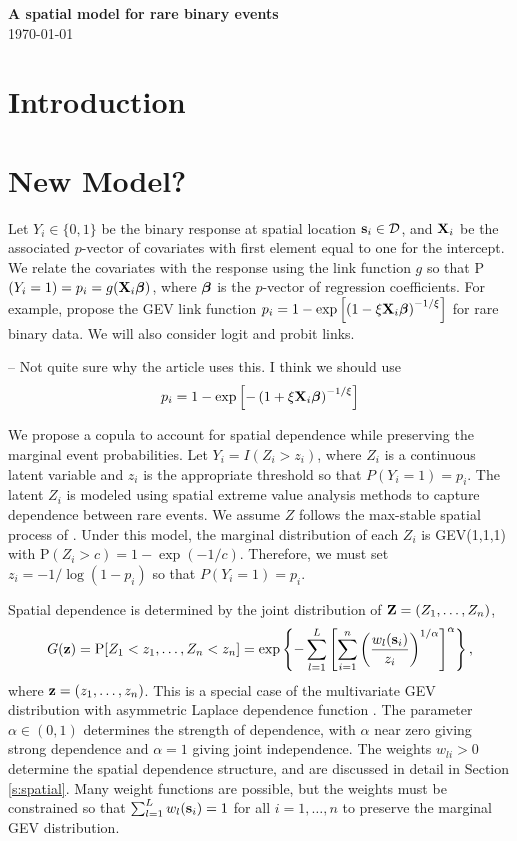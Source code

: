 \documentclass[11pt]{article}
\newcommand{\bbeta}{ \mbox{\boldmath $\beta$}}
\newcommand{\bX}{ \mbox{\bf X}}
\newcommand{\bZ}{ \mbox{\bf Z}}
\newcommand{\bz}{ \mbox{\bf z}}
\newcommand{\bs}{ \mbox{\bf s}}
\newcommand{\calD}{{\cal D}}
\newcommand{\beq}{ \begin{equation}}
\newcommand{\eeq}{ \end{equation}}
\begin{document}
\linenumbers

\begin{center}
{\Large {\bf A spatial model for rare binary events}}\\
\today
\end{center}

\section{Introduction}\label{s:intro}


\section{New Model?}\label{s:model}

Let $Y_i\in\{0,1\}$ be the binary response at spatial location $\bs_i\in\calD$, and $\bX_i$ be the associated $p$-vector of covariates with first element equal to one for the intercept.  We relate the covariates with the response using the link function $g$ so that P$(Y_i=1) = p_i= g(\bX_i\bbeta)$, where $\bbeta$ is the $p$-vector of regression coefficients.  For example, \cite{Wang-2010} propose the GEV link function
$p_i=1-\exp\left[\left(1-\xi\bX_i\bbeta\right)^{-1/\xi}\right]$ for rare binary data. We will also consider logit and probit links.

-- Not quite sure why the article uses this. I think we should use
\begin{align}
	p_i = 1 - \exp \left[ - \left(1 + \xi \bX_i \bbeta \right)^{-1/\xi} \right] 
\end{align}


We propose a copula \citep{nelsen-1999} to account for spatial dependence while preserving the marginal event probabilities. Let $Y_i = I(Z_i>z_i)$, where $Z_i$ is a continuous latent variable and $z_i$ is the appropriate threshold so that $P(Y_i=1)=p_i$.  The latent $Z_i$ is modeled using spatial extreme value analysis methods to capture dependence between rare events.  We assume $Z$ follows the max-stable spatial process of \cite{reich-2012}.  Under this model, the marginal distribution of each $Z_i$ is GEV(1,1,1) with P$(Z_i>c) = 1-\exp(-1/c)$.  Therefore, we must set $z_i=-1/\log(1-p_i)$ so that $P(Y_i=1)=p_i$.
 
Spatial dependence is determined by the joint distribution of $\bZ = (Z_1,\ldots,Z_n)$, 
\beq\label{jointCDF}
 G(\bz) =  \mbox{P}[Z_1<z_1,\ldots,Z_n<z_n] = \exp\left\{-\sum_{l=1}^L\left[\sum_{i=1}^n\left(\frac{w_{l}(\bs_i)}{z_i}\right)^{1/\alpha}\right]^{\alpha}\right\},
\eeq
where $\bz = (z_1,\ldots,z_n)$. This is a special case of the multivariate GEV distribution with asymmetric Laplace dependence function \citep{Tawn-1990}.  The parameter $\alpha\in(0,1)$ determines the strength of dependence, with $\alpha$ near zero giving strong dependence and $\alpha=1$ giving joint independence. The weights $w_{li}>0$ determine the spatial dependence structure, and are discussed in detail in Section \ref{s:spatial}.  Many weight functions are possible, but the weights must be constrained so that $\sum_{l=1}^L w_{l}(\bs_i)=1$ for all $i=1,\ldots,n$ to preserve the marginal GEV distribution.
\end{document}
